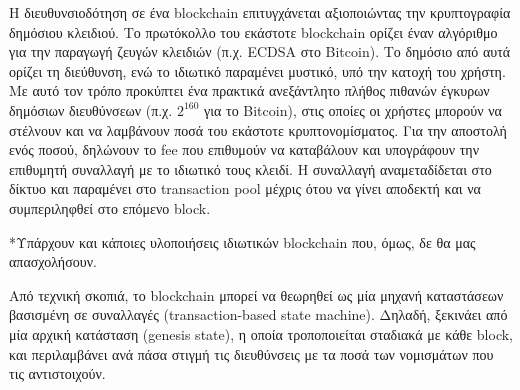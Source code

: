 Η διευθυνσιοδότηση σε ένα blockchain επιτυγχάνεται αξιοποιώντας την κρυπτογραφία δημόσιου κλειδιού. Το πρωτόκολλο του εκάστοτε blockchain ορίζει έναν αλγόριθμο για την παραγωγή ζευγών κλειδιών (π.χ. ECDSA στο Bitcoin). Το δημόσιο από αυτά ορίζει τη διεύθυνση, ενώ το ιδιωτικό παραμένει μυστικό, υπό την κατοχή του χρήστη. Με αυτό τον τρόπο προκύπτει ένα πρακτικά ανεξάντλητο πλήθος πιθανών έγκυρων δημόσιων διευθύνσεων (π.χ. $2^{160}$ για το Bitcoin), στις οποίες οι χρήστες μπορούν να στέλνουν και να λαμβάνουν ποσά του εκάστοτε κρυπτονομίσματος. Για την αποστολή ενός ποσού, δηλώνουν το fee που επιθυμούν να καταβάλουν και υπογράφουν την επιθυμητή συναλλαγή με το ιδιωτικό τους κλειδί. Η συναλλαγή αναμεταδίδεται στο δίκτυο και παραμένει στο transaction pool μέχρις ότου να γίνει αποδεκτή και να συμπεριληφθεί στο επόμενο block.

*Υπάρχουν και κάποιες υλοποιήσεις ιδιωτικών blockchain που, όμως, δε θα μας απασχολήσουν.

Από τεχνική σκοπιά, το blockchain μπορεί να θεωρηθεί ως μία μηχανή καταστάσεων βασισμένη σε συναλλαγές (transaction-based state machine). Δηλαδή, ξεκινάει από μία αρχική κατάσταση (genesis state), η οποία τροποποιείται σταδιακά με κάθε block, και περιλαμβάνει ανά πάσα στιγμή τις διευθύνσεις με τα ποσά των νομισμάτων που τις αντιστοιχούν.

